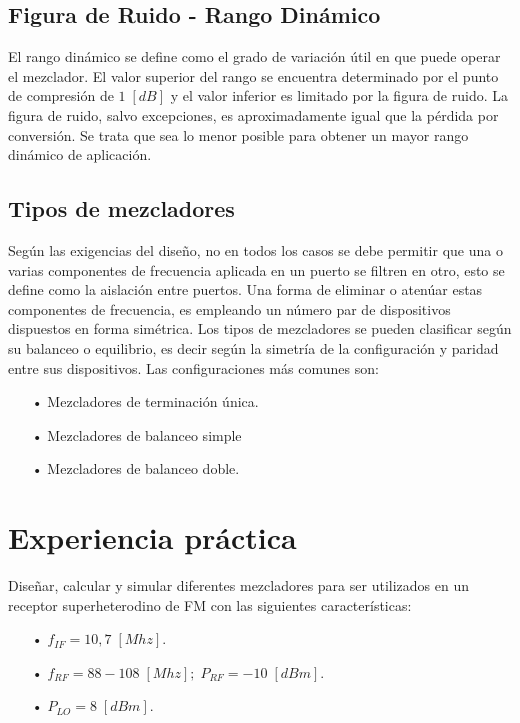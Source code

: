 \documentclass[twocolumn]{article}
\begin{document}
\subsection{Figura de Ruido - Rango Dinámico}
 El rango dinámico se define como el grado de variación útil en que puede operar el mezclador. El valor superior del rango se encuentra determinado por el punto de compresión de $1 \; [dB]$ y el valor inferior es limitado por la figura de ruido. La figura de ruido, salvo excepciones, es aproximadamente igual que la pérdida por conversión. Se trata que sea lo menor posible para obtener un mayor rango dinámico de aplicación.

\subsection{Tipos de mezcladores}  
Según las exigencias del diseño, no en todos los casos se debe permitir que una o varias componentes de frecuencia aplicada en un puerto se filtren en otro, esto se define como la aislación entre puertos. Una forma de eliminar o atenúar estas componentes de frecuencia, es empleando un número par de dispositivos dispuestos en forma simétrica. Los tipos de mezcladores se pueden clasificar según su balanceo o equilibrio, es decir según la simetría de la configuración y paridad entre sus dispositivos. Las configuraciones más comunes son:

\begin{itemize}\itemsep0em
\item[•]  Mezcladores de terminación única.
\item[•]  Mezcladores de balanceo simple
\item[•]  Mezcladores de balanceo doble.
\end{itemize}

\clearpage

\section{Experiencia práctica}
Diseñar, calcular y simular diferentes mezcladores para ser utilizados en un receptor superheterodino de FM con las siguientes características:

\begin{itemize}\itemsep0em
\item[•]  $f_{IF} = 10,7 \; [Mhz]$.
\item[•]  $f_{RF} = 88-108 \; [Mhz]; \; P_{RF} = -10 \; [dBm]$.
\item[•]  $P_{LO} = 8 \;[dBm]$.
\end{itemize}
\end{document}
